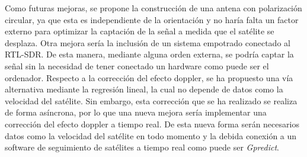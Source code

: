 \documentclass[a4paper,openright,12pt]{article}
\begin{document}
Como futuras mejoras, se propone la construcción de una antena con polarización circular, ya que esta es independiente de la orientación y no haría falta un factor externo para optimizar la captación de la señal a medida que el satélite se desplaza. 
Otra mejora sería la inclusión de un sistema empotrado conectado al RTL-SDR. De esta manera, mediante alguna orden externa, se podría captar la señal sin la necesidad de tener conectado un hardware como puede ser el ordenador.
Respecto a la corrección del efecto doppler, se ha propuesto una vía alternativa mediante la regresión lineal, la cual no depende de datos como la velocidad del satélite. Sin embargo, esta corrección que se ha realizado se realiza de forma asíncrona, por lo que una nueva mejora sería implementar una corrección del efecto doppler a tiempo real. De esta nueva forma serán necesarios datos como la velocidad del satélite en todo momento y la debida conexión a un software de seguimiento de satélites a tiempo real como puede ser \textit{Gpredict}.
\end{document}
